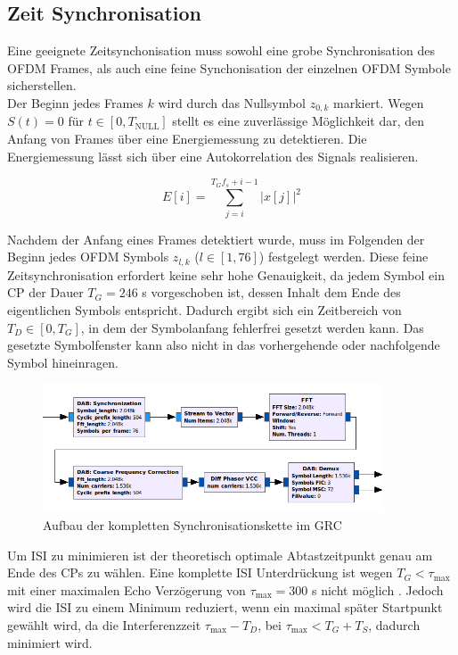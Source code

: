 \subsection{Zeit Synchronisation}
\label{sec:time_sync}
Eine geeignete Zeitsynchonisation muss sowohl eine grobe Synchronisation des OFDM Frames, als auch eine feine Synchonisation der einzelnen OFDM Symbole sicherstellen. \\
Der Beginn jedes Frames $ k $ wird durch das Nullsymbol $z_{0,k}$ markiert. Wegen $S(t) = 0$ für $t \in [0, T_{\text{NULL}}]$ stellt es eine zuverlässige Möglichkeit dar, den Anfang von Frames über eine Energiemessung zu detektieren. Die Energiemessung lässt sich über eine Autokorrelation des Signals realisieren.

\begin{equation}
E[i] = \sum \limits_{j=i}^{T_G f_s + i - 1}|x[j]|^2
\label{eq:energy}
\end{equation}

Nachdem der Anfang eines Frames detektiert wurde, muss im Folgenden der Beginn jedes OFDM Symbols $z_{l,k}$ ($l \in [1, 76]$) festgelegt werden. Diese feine Zeitsynchronisation erfordert keine sehr hohe Genauigkeit, da jedem Symbol ein \ac{CP} der Dauer $T_G = 246$ \textmu s vorgeschoben ist, dessen Inhalt dem Ende des eigentlichen Symbols entspricht. Dadurch ergibt sich ein Zeitbereich von  $T_D \in [0,T_G]$, in dem der Symbolanfang fehlerfrei gesetzt werden kann. Das gesetzte Symbolfenster kann also nicht in das vorhergehende oder nachfolgende Symbol hineinragen.

\begin{figure}[htb]
\centering
  \includegraphics[width=0.9\textwidth]{figures/sync_hier_block.png}
	\caption{Aufbau der kompletten Synchronisationskette im \ac{GRC}}
	\label{fig:sync_overview}
\end{figure}

Um \ac{ISI} zu minimieren ist der theoretisch optimale Abtastzeitpunkt genau am Ende des CPs zu wählen. Eine komplette \ac{ISI} Unterdrückung ist wegen $T_G < \tau_{\text{max}}$ mit einer maximalen Echo Verzögerung von $\tau_{\text{max}} = 300$ \textmu s nicht möglich \cite{dab_buch}. Jedoch wird die \ac{ISI} zu einem Minimum reduziert, wenn ein maximal später Startpunkt gewählt wird, da die Interferenzzeit $\tau_{\text{max}} - T_D$, bei $\tau_{\text{max}} < T_G+T_S$, dadurch minimiert wird.\\

